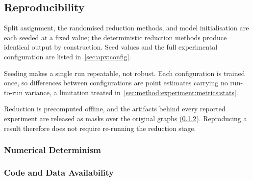 \subsection{Reproducibility}
\label{sec:method:experiment:reproducibility}
Split assignment, the randomised reduction methods, and model initialisation are each
seeded at a fixed value; the deterministic reduction methods produce identical output by
construction. Seed values and the full experimental configuration are listed
in~\ref{sec:apx:config}.

Seeding makes a single run repeatable, not robust. Each configuration is trained once, so
differences between configurations are point estimates carrying no run-to-run variance, a
limitation treated in~\ref{sec:method:experiment:metrics:stats}.

Reduction is precomputed offline, and the artifacts behind every reported experiment are
released as masks over the original graphs
(\ref{sec:method:reproducibility:availability}). Reproducing a result therefore does not
require re-running the reduction stage.

\subsubsection{Numerical Determinism}
\label{sec:method:reproducibility:determinism}

\subsubsection{Code and Data Availability}
\label{sec:method:reproducibility:availability}
